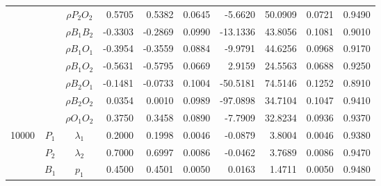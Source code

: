 \documentclass[letterpaper]{article}
\begin{document}
\begin{table}[h]
\begin{tabular}{cccrrrrrrr}
            &             & $\rho{P_2O_2}$ & 0.5705                 & 0.5382                 & 0.0645                 & -5.6620                & 50.0909                & 0.0721                   & 0.9490                 \\
            &             & $\rho{B_1B_2}$ & -0.3303                & -0.2869                & 0.0990                 & -13.1336               & 43.8056                & 0.1081                   & 0.9010                 \\
            &             & $\rho{B_1O_1}$ & -0.3954                & -0.3559                & 0.0884                 & -9.9791                & 44.6256                & 0.0968                   & 0.9170                 \\
            &             & $\rho{B_1O_2}$ & -0.5631                & -0.5795                & 0.0669                 & 2.9159                 & 24.5563                & 0.0688                   & 0.9250                 \\
            &             & $\rho{B_2O_1}$ & -0.1481                & -0.0733                & 0.1004                 & -50.5181               & 74.5146                & 0.1252                   & 0.8910                 \\
            &             & $\rho{B_2O_2}$ & 0.0354                 & 0.0010                 & 0.0989                 & -97.0898               & 34.7104                & 0.1047                   & 0.9410                 \\
            &             & $\rho{O_1O_2}$ & 0.3750                 & 0.3458                 & 0.0890                 & -7.7909                & 32.8234                & 0.0936                   & 0.9370                 \\\hline
10000       & $P_1$       & $\lambda_1$    & 0.2000                 & 0.1998                 & 0.0046                 & -0.0879                & 3.8004                 & 0.0046                   & 0.9380                 \\
            & $P_2$       & $\lambda_2$    & 0.7000                 & 0.6997                 & 0.0086                 & -0.0462                & 3.7689                 & 0.0086                   & 0.9470                 \\
            & $B_1$       & $p_1$          & 0.4500                 & 0.4501                 & 0.0050                 & 0.0163                 & 1.4711                 & 0.0050                   & 0.9480                 \\

\end{tabular}
\end{table}
\end{document}
